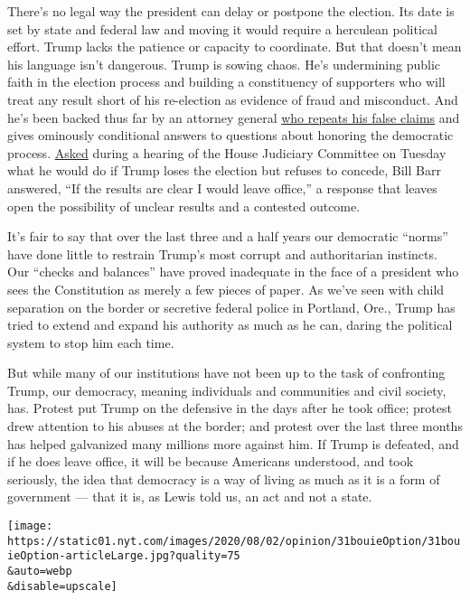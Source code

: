 There's no legal way the president can delay or postpone the election.
Its date is set by state and federal law and moving it would require a
herculean political effort. Trump lacks the patience or capacity to
coordinate. But that doesn't mean his language isn't dangerous. Trump is
sowing chaos. He's undermining public faith in the election process and
building a constituency of supporters who will treat any result short of
his re-election as evidence of fraud and misconduct. And he's been
backed thus far by an attorney general
\href{https://www.cnn.com/2020/06/25/politics/barr-mail-in-voting-election-fraud-npr/index.html}{who
repeats his false claims} and gives ominously conditional answers to
questions about honoring the democratic process.
\href{https://abcnews.go.com/Politics/barr-testimony-live-updates-ag-faces-questions-2020/story?id=72029139}{Asked}
during a hearing of the House Judiciary Committee on Tuesday what he
would do if Trump loses the election but refuses to concede, Bill Barr
answered, ``If the results are clear I would leave office,'' a response
that leaves open the possibility of unclear results and a contested
outcome.

It's fair to say that over the last three and a half years our
democratic ``norms'' have done little to restrain Trump's most corrupt
and authoritarian instincts. Our ``checks and balances'' have proved
inadequate in the face of a president who sees the Constitution as
merely a few pieces of paper. As we've seen with child separation on the
border or secretive federal police in Portland, Ore., Trump has tried to
extend and expand his authority as much as he can, daring the political
system to stop him each time.

But while many of our institutions have not been up to the task of
confronting Trump, our democracy, meaning individuals and communities
and civil society, has. Protest put Trump on the defensive in the days
after he took office; protest drew attention to his abuses at the
border; and protest over the last three months has helped galvanized
many millions more against him. If Trump is defeated, and if he does
leave office, it will be because Americans understood, and took
seriously, the idea that democracy is a way of living as much as it is a
form of government --- that it is, as Lewis told us, an act and not a
state.

\texttt{[image: https://static01.nyt.com/images/2020/08/02/opinion/31bouieOption/31bouieOption-articleLarge.jpg?quality=75\\\&auto=webp\\\&disable=upscale]}

